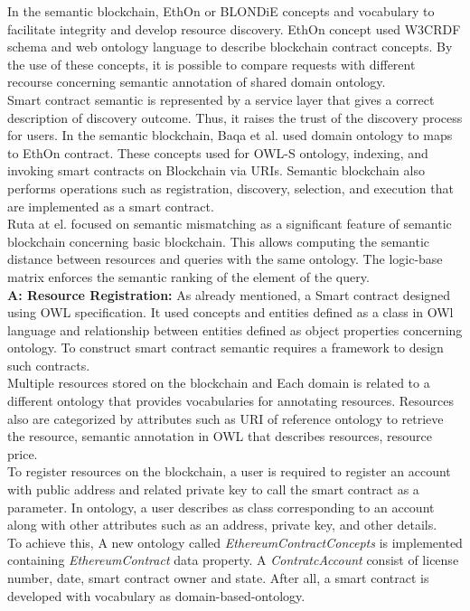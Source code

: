 In the semantic blockchain, EthOn or BLONDiE concepts and vocabulary to facilitate integrity and develop resource discovery. EthOn concept used W3CRDF schema and web ontology language to describe blockchain contract concepts. By the use of these concepts, it is possible to compare requests with different recourse concerning semantic annotation of shared domain ontology. \\
Smart contract semantic is represented by a service layer that gives a correct description of discovery outcome. Thus, it raises the trust of the discovery process for users. In the semantic blockchain, Baqa et al.\cite{Baqa} used domain ontology to maps to EthOn contract. These concepts used for OWL-S ontology, indexing, and invoking smart contracts on Blockchain via URIs\cite{Baqa}. 
Semantic blockchain also performs operations such as registration, discovery, selection, and execution that are implemented as a smart contract. \\
Ruta at el.\cite{Ruta} focused on semantic mismatching as a significant feature of semantic blockchain concerning basic blockchain. This allows computing the semantic distance between resources and queries with the same ontology.
The logic-base matrix enforces the semantic ranking of the element of the query\cite{Ruta}. \\ 
\textbf{A: Resource Registration:}
As already mentioned, a Smart contract designed using OWL specification. It used concepts and entities defined as a class in OWl language and relationship between entities defined as object properties concerning ontology. To construct smart contract semantic requires a framework to design such contracts.\\
Multiple resources stored on the blockchain and Each domain is related to a different ontology that provides vocabularies for annotating resources. Resources also are categorized by attributes such as URI of reference ontology to retrieve the resource, semantic annotation in OWL that describes resources, resource price.\\
To register resources on the blockchain, 
a user is required to register an account with public address and related private key to call the smart contract as a parameter. 
In ontology, a user describes as class corresponding to an account along with other attributes such as an address, private key, and other details. \\
To achieve this, A new ontology called \textit{EthereumContractConcepts} is implemented containing \textit{EthereumContract} data property. A \textit{ContratcAccount}
consist of license number, date, smart contract owner and state.
After all, a smart contract is developed with vocabulary as domain-based-ontology\cite{Baqa}.  


